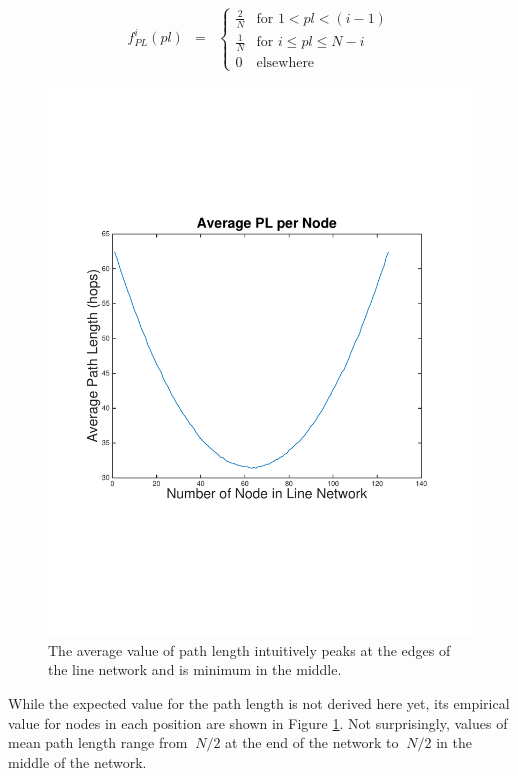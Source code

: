 \begin{eqnarray*}
	f_{PL}^i(pl) &=&
		\left\{\begin{array}{ll}
		\frac{2}{N} & \mbox{for } 1 < pl < (i-1) \\
		\frac{1}{N} & \mbox{for } i \leq pl \leq N-i \\
		0 &\mbox{elsewhere}
		\end{array}\right.
\end{eqnarray*}

\begin{figure}
\begin{centering}
    \includegraphics[scale=0.4, clip=true, trim=15mm 65mm 20mm 65mm]{figures/mean_PL_each_node_line_net_125.pdf}
    \caption{The average value of path length intuitively peaks at the edges of the line network and is minimum in the middle.}
    \label{fig:mean_PL_each_node_line_net}
\end{centering}
\end{figure}

While the expected value for the path length is not derived here yet, its empirical value for nodes in each position are shown in Figure \ref{fig:mean_PL_each_node_line_net}.  Not surprisingly, values of mean path length range from $~N/2$ at the end of the network to $~N/2$ in the middle of the network.  



